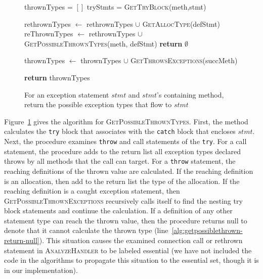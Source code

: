 \begin{figure}[t]
\begin{algorithmic}[1]
\scriptsize
{}
\State thrownTypes = $[]$
\State tryStmts = \textsc{GetTryBlock}(meth,stmt)



\State rethrownTypes $\gets$ rethrownTypes $\cup$ 
\State \hspace{1cm} \textsc{GetAllocType}(defStmt)
\State reThrownTypes $\gets$ rethrownTypes $\cup$
\State \hspace{1cm} \textsc{GetPossibleThrownTypes}(meth, defStmt)
\Else 
\State \textbf{return} $\emptyset$
\label{alg:getpossiblethrown-return-null}
\EndIf
\EndFor


\State thrownTypes $\gets$ thrownTypes $\cup$ 
\State \hspace{1cm}\textsc{GetThrowsExceptions}(succMeth)
\EndFor

\EndIf

\EndFor

\State \textbf{return} thrownTypes

\EndProcedure
\end{algorithmic}
\caption{For an exception statement $stmt$ and $stmt$'s containing
  method, return the possible exception types that flow to
  $stmt$}\label{alg:GetPossibleThrownTypes}
\end{figure}

Figure~\ref{alg:GetPossibleThrownTypes} gives the algorithm for
\textsc{GetPossibleThrownTypes}.  First, the method calculates the
\lstinline!try! block that associates with the \lstinline!catch! block
that encloses $stmt$. Next, the procedure examines \lstinline!throw!
and call statements of the \lstinline!try!.  For a call statement, the
procedure adds to the return list all exception types declared throws
by all methods that the call can target.  For a \lstinline!throw!
statement, the reaching definitions of the thrown value are
calculated.  If the reaching definition is an allocation, then add to
the return list the type of the allocation.  If the reaching
definition is a caught exception statement, then
\textsc{GetPossibleThrownExceptions} recursively calls itself to find
the nesting try block statements and continue the calculation.  If a
definition of any other statement type can reach the thrown value,
then the procedure returns null to denote that it cannot calculate the
thrown type (line~\ref{alg:getpossiblethrown-return-null}).  This
situation causes the examined connection call or rethrown statement in
\textsc{AnalyzeHandler} to be labeled essential (we have not included
the code in the algorithms to propagate this situation to the
essential set, though it is in our implementation).




